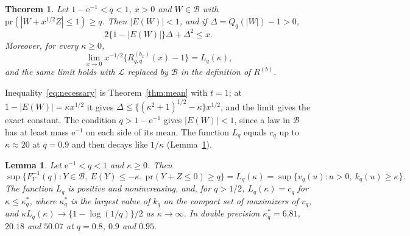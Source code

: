 \documentclass[11pt]{article}
\renewcommand{\_}{\usc\allowbreak}
\newtheorem{theorem}{Theorem}
\newtheorem{lemma}{Lemma}
\newcommand{\pr}{\mathrm{pr}}
\newcommand{\LC}{\mathcal{L}}
\begin{document}
\begin{theorem}\label{thm:transition}
Let $1 - \mathrm{e}^{-1} < q < 1$, $x > 0$ and $W \in \mathcal B$ with $\pr(|W + x^{1/2}Z| \le 1) \ge q$. Then $|E(W)| < 1$, and if $\Delta = Q_q(|W|) - 1 > 0$,
\begin{equation}\label{eq:necessary}
2\{1 - |E(W)|\}\Delta + \Delta^2 \le x .
\end{equation}
Moreover, for every $\kappa \ge 0$,
\[
\lim_{x \to 0} x^{-1/2}\{R^{(b_x)}_{q,q}(x) - 1\} = L_q(\kappa),
\]
and the same limit holds with $\LC$ replaced by $\mathcal B$ in the definition of $R^{(b)}$.
\end{theorem}

Inequality~\eqref{eq:necessary} is Theorem~\ref{thm:mean} with $t = 1$; at $1 - |E(W)| = \kappa x^{1/2}$ it gives $\Delta \le \{(\kappa^2 + 1)^{1/2} - \kappa\}x^{1/2}$, and the limit gives the exact constant. The condition $q > 1 - \mathrm{e}^{-1}$ gives $|E(W)| < 1$, since a law in $\mathcal B$ has at least mass $\mathrm{e}^{-1}$ on each side of its mean. The function $L_q$ equals $c_q$ up to $\kappa \approx 20$ at $q = 0.9$ and then decays like $1/\kappa$ (Lemma~\ref{lem:meanonesided}).

\begin{lemma}\label{lem:meanonesided}
Let $\mathrm{e}^{-1} < q < 1$ and $\kappa \ge 0$. Then
\[
\sup\{F_Y^{-1}(q) : Y \in \mathcal B,\ E(Y) \le -\kappa,\ \pr(Y + Z \le 0) \ge q\} = L_q(\kappa) = \sup\{v_q(u) : u > 0,\ k_q(u) \ge \kappa\}.
\]
The function $L_q$ is positive and nonincreasing, and, for $q > 1/2$, $L_q(\kappa) = c_q$ for $\kappa \le \kappa^*_q$, where $\kappa^*_q$ is the largest value of $k_q$ on the compact set of maximizers of $v_q$, and $\kappa L_q(\kappa) \to \{1 - \log(1/q)\}/2$ as $\kappa \to \infty$. In double precision $\kappa^*_q = 6.81$, $20.18$ and $50.07$ at $q = 0.8$, $0.9$ and $0.95$.
\end{lemma}
\end{document}
